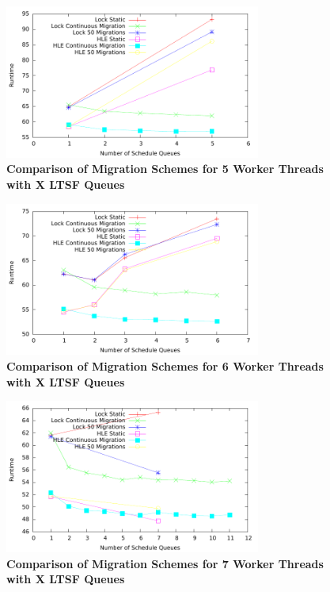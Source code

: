 \documentclass[11pt]{book}
\begin{document}
\begin{figure}
    \centering
    \graphicspath{ {./figures/} }
    \includegraphics[width=0.75\textwidth,keepaspectratio]{migComp_5threads}
    \caption{\textbf{Comparison of Migration Schemes for 5 Worker Threads with X LTSF
        Queues}}\label{fig:migComp_5threads}
\end{figure}

\begin{figure}
    \centering
    \graphicspath{ {./figures/} }
    \includegraphics[width=0.75\textwidth,keepaspectratio]{migComp_6threads}
    \caption{\textbf{Comparison of Migration Schemes for 6 Worker Threads with X LTSF
        Queues}}\label{fig:migComp_6threads}
\end{figure}

\begin{figure}
    \centering
    \graphicspath{ {./figures/} }
    \includegraphics[width=0.75\textwidth,keepaspectratio]{migComp_7threads}
    \caption{\textbf{Comparison of Migration Schemes for 7 Worker Threads with X LTSF
        Queues}}\label{fig:migComp_7threads}
\end{figure}
\end{document}
